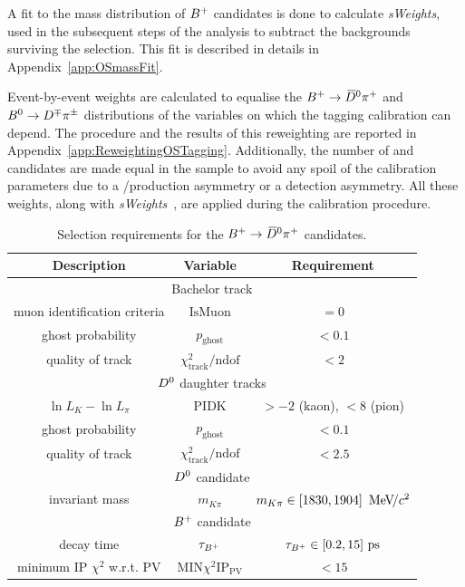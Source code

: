 A fit to the mass distribution of $B^+$ candidates is done to calculate \emph{sWeights},
used in the subsequent steps of the analysis to subtract the backgrounds surviving the selection.
This fit is described in details in Appendix~\ref{app:OSmassFit}.

Event-by-event weights are calculated to equalise the $B^+\rightarrow\kern 0.2em\overline{\kern -0.2em D}{}^0\pi^+$ and $B^0\rightarrow D^\mp\pi^\pm$ distributions of the variables on which
the tagging calibration can depend. The procedure and the results of this reweighting are reported in
Appendix~\ref{app:ReweightingOSTagging}. Additionally, the number of \Bp and \Bm candidates are made equal in the sample to avoid any spoil of the calibration
parameters due to a \Bp/\Bm production asymmetry or a detection asymmetry.
All these weights, along with \emph{sWeights}~\cite{Pivk:2004ty}, are applied during
the calibration procedure.

\begin{table}[htbp]
	\centering
	\caption{Selection requirements for the $B^+\rightarrow\kern 0.2em\overline{\kern -0.2em D}{}^0\pi^+$ candidates.}
	\begin{tabular}{ccc}
		\toprule
		Description & Variable & Requirement \\
		\midrule
		\multicolumn{3}{c}{Bachelor track } \\
		\midrule
		muon identification criteria & $\text{IsMuon}$ & $=0$ \\
		ghost probability & $p_\text{ghost}$ & $<0.1$ \\
		quality of track & $\chi^2_\text{track}/\text{ndof}$ & $<2$ \\
		\midrule
		\multicolumn{3}{c}{$D^0$ daughter tracks} \\
		\midrule
		$\ln L_K - \ln L_\pi$ & $\text{PIDK}$ & $>-2$ (kaon), $<8$ (pion) \\
		ghost probability & $p_\text{ghost}$ & $<0.1$ \\
		quality of track & $\chi^2_\text{track}/\text{ndof}$ & $<2.5$ \\
		\midrule
		\multicolumn{3}{c}{$D^0$ candidate} \\
		\midrule
		invariant mass & $m_{K\pi}$ & $m_{K\pi}\in [1830,1904]~{\mathrm{\,Me\kern -0.1em V\!/}c^2}$ \\	
		\midrule
                \multicolumn{3}{c}{$B^+$ candidate} \\
		\midrule
		decay time & $\tau_{B^+}$ & $\tau_{B^+}\in [0.2,15]~\rm ps$ \\
		minimum IP $\chi^2$ w.r.t. PV & $\text{MIN}\chi^2\text{IP}_\text{PV}$ & $<15$ \\
		\bottomrule
	\end{tabular}
	\label{tab:OSSelection}
\end{table}

